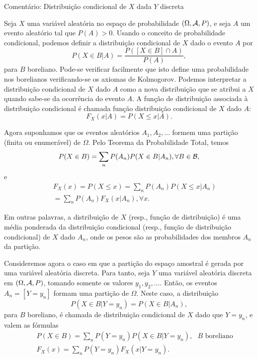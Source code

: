 \begin{frame}{Comentário: Distribuição condicional de $X$ dada $Y$ discreta}

Seja $X$ uma variável aleatória no espaço de probabilidade
$(\Omega,{\cal A},P)$, e seja $A$ um evento aleatório tal que $P(A)>0$.
Usando o conceito de probabilidade condicional, podemos definir a
distribuição condicional de $X$ dado o evento $A$ por
$$P(X\in B|A)=\frac{P([X\in B]\cap A)}{P(A)},$$
para $B$ boreliano. Pode-se verificar facilmente que isto define uma
probabilidade nos borelianos verificando-se os axiomas de
Kolmogorov. Podemos interpretar a distribuição condicional de $X$
dado $A$ como a nova distribuição que se atribui a $X$ quando
sabe-se da ocorrência do evento $A$. A função de distribuição
associada à distribuição condicional é chamada função distribuição
condicional de $X$ dado $A$:
$$F_X(x|A)=P(X\leq x|A).$$

Agora suponhamos que os eventos aleatórios $A_1,A_2,\ldots$ formem
uma partição (finita ou enumerável) de $\Omega$. Pelo Teorema da
Probabilidade Total, temos
$$P(X\in B)=\sum_n P(A_n)P(X\in B|A_n),\forall B\in {\cal B},$$
e
\begin{eqnarray}
& & F_X(x)=P(X\leq x)=\sum_n P(A_n)P(X\leq x|A_n) \nonumber \\
& & =\sum_n P(A_n)F_X(x|A_n), \forall x. \nonumber
\end{eqnarray}

\end{frame}
\begin{frame}
Em outras palavras, a distribuição de $X$ (resp., função de
distribuição) é uma média ponderada da distribuição condicional
(resp., função de distribuição condicional) de $X$ dado $A_n$, onde
os pesos são as probabilidades dos membros $A_n$ da partição.

\bigskip
Consideremos agora o caso em que a partição do espaço amostral é
gerada por uma variável aleatória discreta. Para tanto, seja $Y$ uma
variável aleatória discreta em $(\Omega,{\cal A}, P)$, tomando somente os
valores $y_1,y_2,\ldots$. Então, os eventos $A_n=[Y=y_n]$ formam uma
partição de $\Omega$. Neste caso, a distribuição
$$P(X\in B|Y=y_n)=P(X\in B|A_n),$$
para $B$ boreliano, é chamada de distribuição condicional de $X$
dado que $Y=y_n$, e valem as fórmulas
\begin{eqnarray}
& & P(X\in B)=\sum_n P(Y=y_n)P(X\in B|Y=y_n), \mbox{ $B$ boreliano}
\nonumber \\
& & F_X(x)=\sum_n P(Y=y_n)F_X(x|Y=y_n). \nonumber
\end{eqnarray}
\end{frame}



